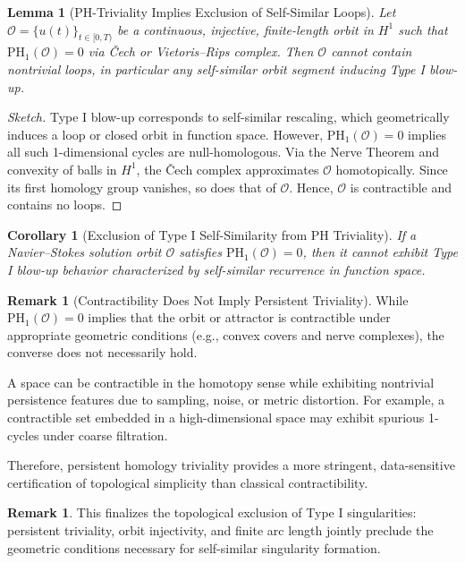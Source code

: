 \documentclass[11pt]{article}
\newtheorem{lemma}[theorem]{Lemma}
\newtheorem{corollary}[theorem]{Corollary}
\theoremstyle{definition}
\newtheorem{remark}[theorem]{Remark}
\begin{document}
\begin{lemma}[PH-Triviality Implies Exclusion of Self-Similar Loops]
Let \( \mathcal{O} = \{u(t)\}_{t \in [0,T)} \) be a continuous, injective, finite-length orbit in \( H^1 \) such that \( \mathrm{PH}_1(\mathcal{O}) = 0 \) via Čech or Vietoris–Rips complex. Then \( \mathcal{O} \) cannot contain nontrivial loops, in particular any self-similar orbit segment inducing Type I blow-up.
\end{lemma}

\begin{proof}[Sketch]
Type I blow-up corresponds to self-similar rescaling, which geometrically induces a loop or closed orbit in function space. However, \( \mathrm{PH}_1(\mathcal{O}) = 0 \) implies all such 1-dimensional cycles are null-homologous. Via the Nerve Theorem and convexity of balls in \( H^1 \), the Čech complex approximates \( \mathcal{O} \) homotopically. Since its first homology group vanishes, so does that of \( \mathcal{O} \). Hence, \( \mathcal{O} \) is contractible and contains no loops.
\end{proof}

\begin{corollary}[Exclusion of Type I Self-Similarity from PH Triviality]
If a Navier–Stokes solution orbit \( \mathcal{O} \) satisfies \( \mathrm{PH}_1(\mathcal{O}) = 0 \), then it cannot exhibit Type I blow-up behavior characterized by self-similar recurrence in function space.
\end{corollary}

\begin{remark}[Contractibility Does Not Imply Persistent Triviality]
While $\mathrm{PH}_1(\mathcal{O}) = 0$ implies that the orbit or attractor is contractible under appropriate geometric conditions (e.g., convex covers and nerve complexes), the converse does not necessarily hold.

A space can be contractible in the homotopy sense while exhibiting nontrivial persistence features due to sampling, noise, or metric distortion. For example, a contractible set embedded in a high-dimensional space may exhibit spurious 1-cycles under coarse filtration.

Therefore, persistent homology triviality provides a more stringent, data-sensitive certification of topological simplicity than classical contractibility.
\end{remark}

\begin{remark}
This finalizes the topological exclusion of Type I singularities: persistent triviality, orbit injectivity, and finite arc length jointly preclude the geometric conditions necessary for self-similar singularity formation.
\end{remark}
\end{document}
